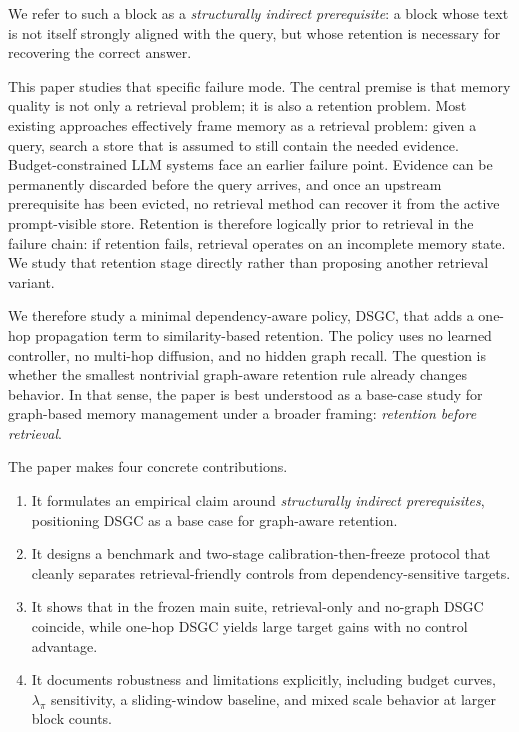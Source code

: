 \documentclass[10pt]{article}
\begin{document}
We refer to such a block as a \emph{structurally indirect prerequisite}: a block whose text is not itself strongly aligned with the query, but whose retention is necessary for recovering the correct answer.

This paper studies that specific failure mode. The central premise is that memory quality is not only a retrieval problem; it is also a retention problem. Most existing approaches effectively frame memory as a retrieval problem: given a query, search a store that is assumed to still contain the needed evidence. Budget-constrained LLM systems face an earlier failure point. Evidence can be permanently discarded before the query arrives, and once an upstream prerequisite has been evicted, no retrieval method can recover it from the active prompt-visible store. Retention is therefore logically prior to retrieval in the failure chain: if retention fails, retrieval operates on an incomplete memory state. We study that retention stage directly rather than proposing another retrieval variant.

We therefore study a minimal dependency-aware policy, DSGC, that adds a one-hop propagation term to similarity-based retention. The policy uses no learned controller, no multi-hop diffusion, and no hidden graph recall. The question is whether the smallest nontrivial graph-aware retention rule already changes behavior. In that sense, the paper is best understood as a base-case study for graph-based memory management under a broader framing: \emph{retention before retrieval}.

The paper makes four concrete contributions.
\begin{enumerate}[leftmargin=1.3em]
  \item It formulates an empirical claim around \emph{structurally indirect prerequisites}, positioning DSGC as a base case for graph-aware retention.
  \item It designs a benchmark and two-stage calibration-then-freeze protocol that cleanly separates retrieval-friendly controls from dependency-sensitive targets.
  \item It shows that in the frozen main suite, retrieval-only and no-graph DSGC coincide, while one-hop DSGC yields large target gains with no control advantage.
  \item It documents robustness and limitations explicitly, including budget curves, $\lambda_\pi$ sensitivity, a sliding-window baseline, and mixed scale behavior at larger block counts.
\end{enumerate}
\end{document}
